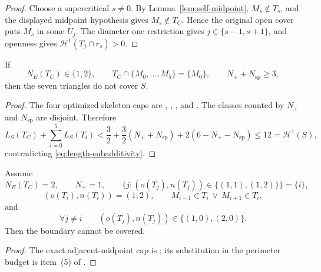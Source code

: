\begin{proof}
Choose a supercritical $s\ne0$.  By Lemma~\ref{lem:self-midpoint},
$M_s\notin T_s$, and the displayed midpoint hypothesis gives
$M_s\notin T_C$.  Hence the original open cover puts $M_s$ in some $U_j$.
The diameter-one restriction gives $j\in\{s-1,s+1\}$, and openness gives
$\mathcal H^1(T_j\cap r_s)>0$.
\end{proof}

\begin{theorem}
\label{thm:common-skeleton-count}
If
\[
 N_E(T_C)\in\{1,2\},
 \qquad
 T_C\cap\{M_0,\ldots,M_5\}=\{M_0\},
 \qquad
 N_++N_{\mathrm{sp}}\ge3,
\]
then the seven triangles do not cover $S$.
\end{theorem}

\begin{proof}
The four optimized skeleton caps are
,
,
, and
.  The classes counted by $N_+$ and
$N_{\mathrm{sp}}$ are disjoint.  Therefore
\[
 L_S(T_C)+\sum_{i=0}^5L_S(T_i)
 <\frac32+\frac32(N_++N_{\mathrm{sp}})
   +2(6-N_+-N_{\mathrm{sp}})
 \le12=\mathcal H^1(S),
\]
contradicting \eqref{eq:length-subadditivity}.
\end{proof}

\begin{proposition}
\label{prop:ce2-vd2-midpoint-length}
Assume
\[
 N_E(T_C)=2,
 \qquad N_+=1,
 \qquad
 \{j:(o(T_j),n(T_j))\in\{(1,1),(1,2)\}\}=\{i\},
\]
\[
 (o(T_i),n(T_i))=(1,2),
 \qquad
 M_{i-1}\in T_i\ \lor\ M_{i+1}\in T_i,
\]
and
\[
 \forall j\ne i\qquad
 (o(T_j),n(T_j))\in\{(1,0),(2,0)\}.
\]
Then the boundary cannot be covered.
\end{proposition}

\begin{proof}
The exact adjacent-midpoint cap is
; its substitution in the perimeter
budget is item~(5) of .
\end{proof}

